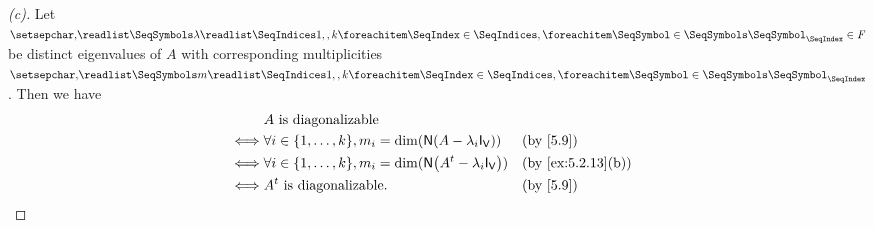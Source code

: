 \begin{proof}[(c)]
  Let \(\seq{\lambda}{1,,k} \in \F\) be distinct eigenvalues of \(A\) with corresponding multiplicities \(\seq{m}{1,,k}\).
  Then we have
  \begin{align*}
         & A \text{ is diagonalizable}                                                                                       \\
    \iff & \forall i \in \set{1, \dots, k}, m_i = \dim(\ns{A - \lambda_i \IT[\V]})      &  & \text{(by \cref{5.9})}          \\
    \iff & \forall i \in \set{1, \dots, k}, m_i = \dim(\ns{\tp{A} - \lambda_i \IT[\V]}) &  & \text{(by \cref{ex:5.2.13}(b))} \\
    \iff & \tp{A} \text{ is diagonalizable}.                                            &  & \text{(by \cref{5.9})}
  \end{align*}
\end{proof}
